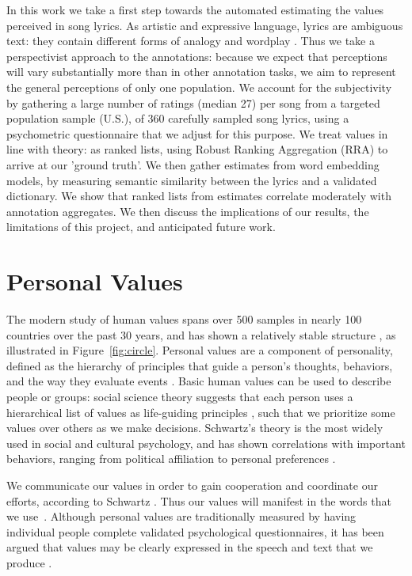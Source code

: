 \documentclass{article}
\begin{document}
In this work we take a first step towards the automated estimating the values perceived in song lyrics. As artistic and expressive language, lyrics are ambiguous text: they contain different forms of analogy and wordplay \cite{sandri2023don}. Thus we take a perspectivist approach to the annotations: because we expect that perceptions will vary substantially more than in other annotation tasks, we aim to represent the general perceptions of only one population. We account for the subjectivity by gathering a large number of ratings (median 27) per song from a targeted population sample (U.S.), of 360 carefully sampled song lyrics, using a psychometric questionnaire that we adjust for this purpose. We treat values in line with theory: as ranked lists, using Robust Ranking Aggregation (RRA) to arrive at our 'ground truth'. We then gather estimates from word embedding models, by measuring semantic similarity between the lyrics and a validated dictionary. We show that ranked lists from estimates correlate moderately with annotation aggregates. We then discuss the implications of our results, the limitations of this project, and anticipated future work. 

\section{Personal Values}
The modern study of human values spans over 500 samples in nearly 100 countries over the past 30 years, and has shown a relatively stable structure \cite{sagiv2022personal}, as illustrated in Figure~\ref{fig:circle}. Personal values are a component of personality, defined as the hierarchy of principles that guide a person's thoughts, behaviors, and the way they evaluate events \cite{schwartz1987toward, schwartz2012overview}. Basic human values can be used to describe people or groups: social science theory suggests that each person uses a hierarchical list of values as life-guiding principles \cite{rokeach1973nature}, such that we prioritize some values over others as we make decisions. Schwartz's theory is the most widely used in social and cultural psychology, and has shown correlations with important behaviors, ranging from political affiliation to personal preferences \cite{sagiv2022personal}.

We communicate our values in order to gain cooperation and coordinate our efforts, according to Schwartz \cite{schwartz1992universals}. Thus our values will manifest in the words that we use~\cite{boyd2017language}. Although personal values are traditionally measured by having individual people complete validated psychological questionnaires, it has been argued that values may be clearly expressed in the speech and text that we produce \cite{boyd2017language}. 
\end{document}
